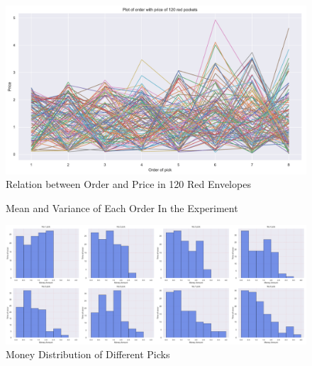 \documentclass{scrartcl}
\begin{document}
\begin{figure}[H]
	\begin{center}
		\includegraphics[width=15cm]{pic6.pdf}
	\end{center}
	\caption{Relation between Order and Price in 120 Red Envelopes}
	\label{Mess}
\end{figure}

\begin{figure}[H]
\centering    
{}     
\caption{ Mean and Variance of Each Order In the Experiment}     
\label{mean_var_exp} 
\end{figure}

\begin{figure}[H]
	\begin{center}
		\includegraphics[width=15cm]{pic10.pdf}
	\end{center}
	\caption{Money Distribution of Different Picks}
	\label{PriceDistribution_1}
\end{figure}
\end{document}
